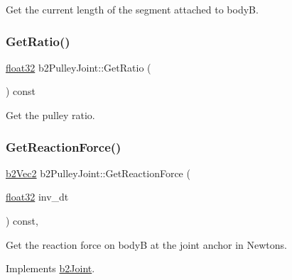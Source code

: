 Get the current length of the segment attached to bodyB. 

\mbox{\label{classb2_pulley_joint_a130e85a48bfe54588d15766b94e3b2b2}} 
\subsubsection{\texorpdfstring{GetRatio()}{GetRatio()}}
{\footnotesize\ttfamily \mbox{\hyperlink{b2_settings_8h_aacdc525d6f7bddb3ae95d5c311bd06a1}{float32}} b2\+Pulley\+Joint\+::\+Get\+Ratio (\begin{DoxyParamCaption}{ }\end{DoxyParamCaption}) const}



Get the pulley ratio. 

\mbox{\label{classb2_pulley_joint_a90904a458169a22fe0a9e2c4f5332101}} 
\subsubsection{\texorpdfstring{GetReactionForce()}{GetReactionForce()}}
{\footnotesize\ttfamily \mbox{\hyperlink{structb2_vec2}{b2\+Vec2}} b2\+Pulley\+Joint\+::\+Get\+Reaction\+Force (\begin{DoxyParamCaption}\item[{\mbox{\hyperlink{b2_settings_8h_aacdc525d6f7bddb3ae95d5c311bd06a1}{float32}}}]{inv\+\_\+dt }\end{DoxyParamCaption}) const\hspace{0.3cm}{\ttfamily [override]}, {\ttfamily [virtual]}}



Get the reaction force on bodyB at the joint anchor in Newtons. 



Implements \mbox{\hyperlink{classb2_joint_a7e0eddefb9b69ad050b8ef6425838a74}{b2\+Joint}}.

\mbox{\label{classb2_pulley_joint_a707bed4e4541d5da58022a6ee2bc58a1}} 
